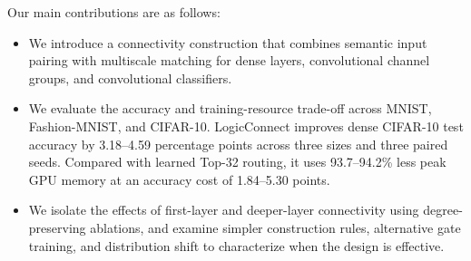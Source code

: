 Our main contributions are as follows:

\begin{itemize}
\item We introduce a connectivity construction that combines semantic input pairing with multiscale matching for dense layers, convolutional channel groups, and convolutional classifiers.
\item We evaluate the accuracy and training-resource trade-off across MNIST, Fashion-MNIST, and CIFAR-10. LogicConnect improves dense CIFAR-10 test accuracy by 3.18–4.59 percentage points across three sizes and three paired seeds. Compared with learned Top-32 routing, it uses 93.7–94.2\% less peak GPU memory at an accuracy cost of 1.84–5.30 points.
\item We isolate the effects of first-layer and deeper-layer connectivity using degree-preserving ablations, and examine simpler construction rules, alternative gate training, and distribution shift to characterize when the design is effective.
\end{itemize}
